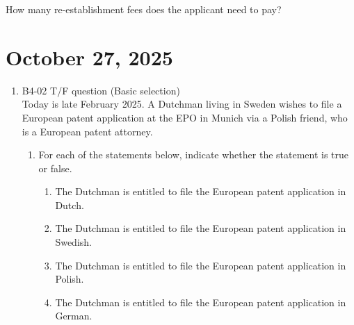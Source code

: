 \documentclass{report}
\begin{document}
\begin{enumerate}[label=\textbf{Question \arabic*}]
\begin{enumerate}[label=\textbf{Question \arabic*}]
    \vspace{1em}
    How many re-establishment fees does the applicant need to pay? 

\end{enumerate}
 \section{October 27, 2025}


\begin{enumerate}[label=\textbf{Question \arabic*}]

    \item %
    B4-02 \quad T/F question (Basic selection) \\
    Today is late February 2025. A Dutchman living in Sweden wishes to file a European patent application at the EPO in Munich via a Polish friend, who is a European patent attorney.
    
    \begin{enumerate}[label=(\alph*)]
        \item For each of the statements below, indicate whether the statement is true or false.
        \begin{enumerate}[label={(\alph{enumi}.\arabic*)}]
            \item The Dutchman is entitled to file the European patent application in Dutch.
            \item The Dutchman is entitled to file the European patent application in Swedish.
            \item The Dutchman is entitled to file the European patent application in Polish.
            \item The Dutchman is entitled to file the European patent application in German.
        \end{enumerate}
        

\end{enumerate}
\end{enumerate}
\end{enumerate}
\end{document}
